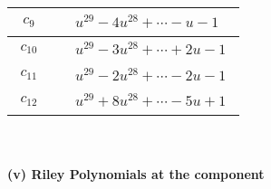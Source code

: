 \documentclass[1p]{elsarticle_modified}
\theoremstyle{definition}
\begin{document}
\begin{tabular}{m{50pt}|m{274pt}}
\hline $$\begin{aligned}c_{9}\end{aligned}$$&$\begin{aligned}
&u^{29}-4 u^{28}+\cdots- u-1
\end{aligned}$\\
\hline $$\begin{aligned}c_{10}\end{aligned}$$&$\begin{aligned}
&u^{29}-3 u^{28}+\cdots+2 u-1
\end{aligned}$\\
\hline $$\begin{aligned}c_{11}\end{aligned}$$&$\begin{aligned}
&u^{29}-2 u^{28}+\cdots-2 u-1
\end{aligned}$\\
\hline $$\begin{aligned}c_{12}\end{aligned}$$&$\begin{aligned}
&u^{29}+8 u^{28}+\cdots-5 u+1
\end{aligned}$\\
\hline
\end{tabular}\\~\\
\newpage\renewcommand{\arraystretch}{1}
\flushleft \textbf{(v) Riley Polynomials at the component}\newline \\
\end{document}
